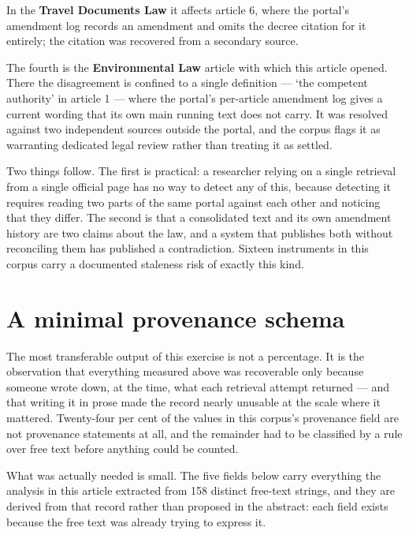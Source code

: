\documentclass[11pt]{article}
\begin{document}
In the \textbf{Travel Documents Law} it affects article 6, where the portal's
amendment log records an amendment and omits the decree citation for it
entirely; the citation was recovered from a secondary source.

The fourth is the \textbf{Environmental Law} article with which this article
opened. There the disagreement is confined to a single definition --- `the
competent authority' in article 1 --- where the portal's per-article amendment
log gives a current wording that its own main running text does not carry. It
was resolved against two independent sources outside the portal, and the corpus
flags it as warranting dedicated legal review rather than treating it as
settled.

Two things follow. The first is practical: a researcher relying on a single
retrieval from a single official page has no way to detect any of this, because
detecting it requires reading two parts of the same portal against each other
and noticing that they differ. The second is that a consolidated text and its
own amendment history are two claims about the law, and a system that publishes
both without reconciling them has published a contradiction. Sixteen
instruments in this corpus carry a documented staleness risk of exactly this
kind.

\section{A minimal provenance schema}
\label{sec:schema}

The most transferable output of this exercise is not a percentage. It is the
observation that everything measured above was recoverable only because someone
wrote down, at the time, what each retrieval attempt returned --- and that
writing it in prose made the record nearly unusable at the scale where it
mattered. Twenty-four per cent of the values in this corpus's provenance field
are not provenance statements at all, and the remainder had to be classified by
a rule over free text before anything could be counted.

What was actually needed is small. The five fields below carry everything the
analysis in this article extracted from 158 distinct free-text strings, and
they are derived from that record rather than proposed in the abstract: each
field exists because the free text was already trying to express it.
\end{document}
